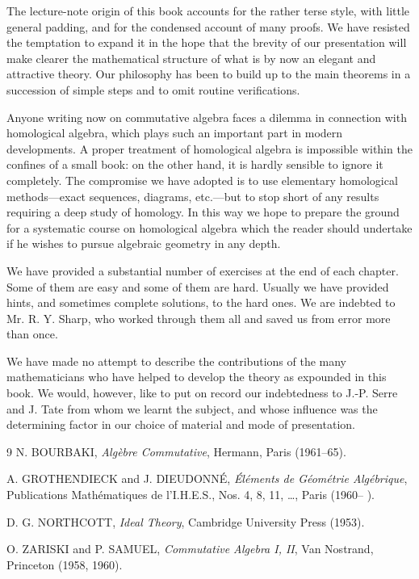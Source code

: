 The lecture-note origin of this book accounts for the rather terse style, with little general padding, and for the condensed account of many proofs. We have resisted the temptation to expand it in the hope that the brevity of our presentation will make clearer the mathematical structure of what is by now an elegant and attractive theory. Our philosophy has been to build up to the main theorems in a succession of simple steps and to omit routine verifications.

Anyone writing now on commutative algebra faces a dilemma in connection with homological algebra, which plays such an important part in modern developments. A proper treatment of homological algebra is impossible within the confines of a small book: on the other hand, it is hardly sensible to ignore it completely. The compromise we have adopted is to use elementary homological methods---exact sequences, diagrams, etc.---but to stop short of any results requiring a deep study of homology. In this way we hope to prepare the ground for a systematic course on homological algebra which the reader should undertake if he wishes to pursue algebraic geometry in any depth.

We have provided a substantial number of exercises at the end of each chapter. Some of them are easy and some of them are hard. Usually we have provided hints, and sometimes complete solutions, to the hard ones. We are indebted to Mr. R. Y. Sharp, who worked through them all and saved us from error more than once.

We have made no attempt to describe the contributions of the many mathematicians who have helped to develop the theory as expounded in this book. We would, however, like to put on record our indebtedness to J.-P. Serre and J. Tate from whom we learnt the subject, and whose influence was the determining factor in our choice of material and mode of presentation.

\begin{thebibliography}{9}
N. BOURBAKI, \emph{Alg\`ebre Commutative}, Hermann, Paris (1961--65).

A. GROTHENDIECK and J. DIEUDONN\'E, \emph{\'El\'ements de G\'eom\'etrie Alg\'ebrique}, Publications Math\'ematiques de l'I.H.E.S., Nos. 4, 8, 11, \ldots, Paris (1960-- ).

D. G. NORTHCOTT, \emph{Ideal Theory}, Cambridge University Press (1953).

O. ZARISKI and P. SAMUEL, \emph{Commutative Algebra I, II}, Van Nostrand, Princeton (1958, 1960).
\end{thebibliography}


